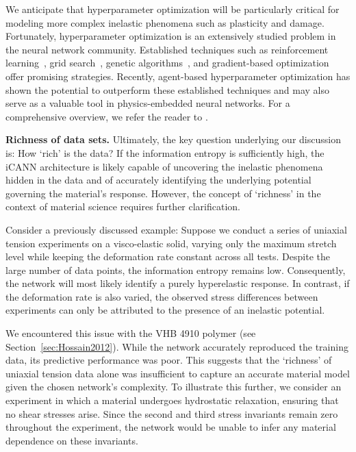 We anticipate that hyperparameter optimization will be particularly critical for modeling more complex inelastic phenomena such as plasticity and damage.
Fortunately, hyperparameter optimization is an extensively studied problem in the neural network community. 
Established techniques such as reinforcement learning~\cite{wu2020}, grid search~\cite{bergstra2011}, genetic algorithms~\cite{sun2019}, and gradient-based optimization~\cite{pedregosa2016} offer promising strategies.
Recently, agent-based hyperparameter optimization \cite{esmaeili2023} has shown the potential to outperform these established techniques and may also serve as a valuable tool in physics-embedded neural networks.
For a comprehensive overview, we refer the reader to \citet{bischl2023}.\newline

\textbf{Richness of data sets.} Ultimately, the key question underlying our discussion is: 
How `rich' is the data? 
If the information entropy is sufficiently high, the iCANN architecture is likely capable of uncovering the inelastic phenomena hidden in the data and of accurately identifying the underlying potential governing the material’s response. 
However, the concept of `richness' in the context of material science requires further clarification.

Consider a previously discussed example: 
Suppose we conduct a series of uniaxial tension experiments on a visco-elastic solid, varying only the maximum stretch level while keeping the deformation rate constant across all tests.
Despite the large number of data points, the information entropy remains low. 
Consequently, the network will most likely identify a purely hyperelastic response. 
In contrast, if the deformation rate is also varied, the observed stress differences between experiments can only be attributed to the presence of an inelastic potential.

We encountered this issue with the VHB 4910 polymer (see Section~\ref{sec:Hossain2012}). 
While the network accurately reproduced the training data, its predictive performance was poor. 
This suggests that the `richness' of uniaxial tension data alone was insufficient to capture an accurate material model given the chosen network’s complexity. 
To illustrate this further, we consider an experiment in which a material undergoes hydrostatic relaxation, ensuring that no shear stresses arise. 
Since the second and third stress invariants remain zero throughout the experiment, the network would be unable to infer any material dependence on these invariants.

